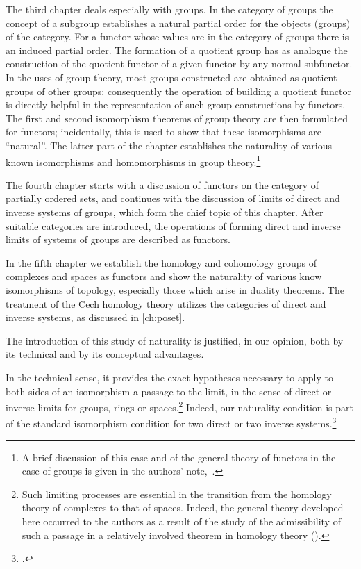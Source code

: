 \documentclass[11pt,a4paper]{report}
\begin{document}
The third chapter deals especially with groups. In the category of groups the concept of a subgroup establishes a natural
partial order for the objects (groups) of the category. For a functor whose values are in the category of groups there is
an induced partial order. The formation of a quotient group has as analogue the construction of the quotient functor of a
given functor by any normal subfunctor. In the uses of group theory, most groups constructed are obtained as quotient groups
of other groups; consequently the operation of building a quotient functor is directly helpful in the representation of such
group constructions by functors. The first and second isomorphism theorems of group theory are then formulated for functors;
incidentally, this is used to show that these isomorphisms are ``natural''. The latter part of the chapter establishes the 
naturality of various known isomorphisms and homomorphisms in group theory.\footnote{A brief discussion of this case and of 
the general theory of functors in the case of groups is given in the authors' note,~\cite{groups42}.\label{ft:groups42}}

The fourth chapter starts with a discussion of functors on the category of partially ordered sets, and continues with the
discussion of limits of direct and inverse systems of groups, which form the chief topic of this chapter. After suitable
categories are introduced, the operations of forming direct and inverse limits of systems of groups are described as functors.

In the fifth chapter we establish the homology and cohomology groups of complexes and spaces as functors and show the 
naturality of various know isomorphisms of topology, especially those which arise in duality theorems. The treatment of
the \u{C}ech homology theory utilizes the categories of direct and inverse systems, as discussed in \cref{ch:poset}.

The introduction of this study of naturality is justified, in our opinion, both by its technical and by its conceptual
advantages.

In the technical sense, it provides the exact hypotheses necessary to apply to both sides of an isomorphism a passage
to the limit, in the sense of direct or inverse limits for groups, rings or spaces.\footnote{Such limiting processes
are essential in the transition from the homology theory of complexes to that of spaces. Indeed, the general theory
developed here occurred to the authors as a result of the study of the admissibility of such a passage in a relatively
involved theorem in homology theory (\cite[especially, p.~777 and p.~815]{eilenberg42}).} Indeed, our naturality
condition is part of the standard isomorphism condition for two direct or two inverse systems.\footcite{freud37}
\end{document}
